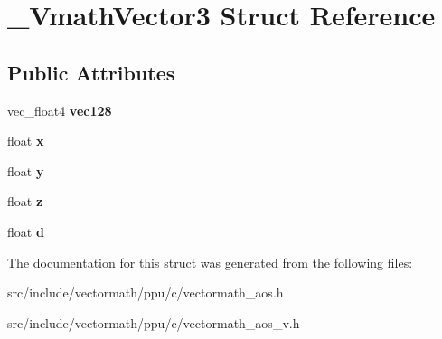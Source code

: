 \hypertarget{struct__VmathVector3}{\section{\-\_\-\-Vmath\-Vector3 Struct Reference}
\label{struct__VmathVector3}
}
\subsection*{Public Attributes}
\begin{DoxyCompactItemize}
\item 
\hypertarget{struct__VmathVector3_ad49d2e07b5d3f8603b8a508e648d9520}{vec\-\_\-float4 {\bfseries vec128}}\label{struct__VmathVector3_ad49d2e07b5d3f8603b8a508e648d9520}

\item 
\hypertarget{struct__VmathVector3_a8fe5c01803334b5805e531519bd540d5}{float {\bfseries x}}\label{struct__VmathVector3_a8fe5c01803334b5805e531519bd540d5}

\item 
\hypertarget{struct__VmathVector3_afceb85bf7b65e2205c6f834dca89565d}{float {\bfseries y}}\label{struct__VmathVector3_afceb85bf7b65e2205c6f834dca89565d}

\item 
\hypertarget{struct__VmathVector3_a15ede43efa34ba55f13913acf25595c2}{float {\bfseries z}}\label{struct__VmathVector3_a15ede43efa34ba55f13913acf25595c2}

\item 
\hypertarget{struct__VmathVector3_ab613d4e620bfa29e1df587c3d1f82ed7}{float {\bfseries d}}\label{struct__VmathVector3_ab613d4e620bfa29e1df587c3d1f82ed7}

\end{DoxyCompactItemize}


The documentation for this struct was generated from the following files\-:\begin{DoxyCompactItemize}
\item 
src/include/vectormath/ppu/c/vectormath\-\_\-aos.\-h\item 
src/include/vectormath/ppu/c/vectormath\-\_\-aos\-\_\-v.\-h\end{DoxyCompactItemize}

